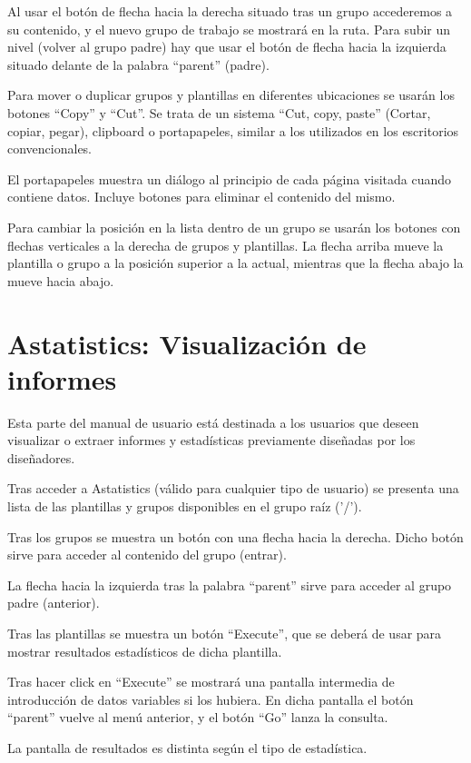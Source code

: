 \documentclass[spanish,12pt]{book}
\begin{document}
Al usar el botón de flecha hacia la derecha situado tras un grupo accederemos a su contenido, y el nuevo grupo de trabajo se mostrará en la ruta. Para subir un nivel (volver al grupo padre) hay que usar el botón de flecha hacia la izquierda situado delante de la palabra ``parent'' (padre).

Para mover o duplicar grupos y plantillas en diferentes ubicaciones se usarán los botones ``Copy'' y ``Cut''. Se trata de un sistema ``Cut, copy, paste'' (Cortar, copiar, pegar), clipboard o portapapeles, similar a los utilizados en los escritorios convencionales.

El portapapeles muestra un diálogo al principio de cada página visitada cuando contiene datos. Incluye botones para eliminar el contenido del mismo.

Para cambiar la posición en la lista dentro de un grupo se usarán los botones con flechas verticales a la derecha de grupos y plantillas. La flecha arriba mueve la plantilla o grupo a la posición superior a la actual, mientras que la flecha abajo la mueve hacia abajo.

\chapter{Astatistics: Visualización de informes}
Esta parte del manual de usuario está destinada a los usuarios que deseen visualizar o extraer informes y estadísticas previamente diseñadas por los diseñadores.

Tras acceder a Astatistics (válido para cualquier tipo de usuario) se presenta una lista de las plantillas y grupos disponibles en el grupo raíz ('/').

Tras los grupos se muestra un botón con una flecha hacia la derecha. Dicho botón sirve para acceder al contenido del grupo (entrar).

La flecha hacia la izquierda tras la palabra ``parent'' sirve para acceder al grupo padre (anterior).

Tras las plantillas se muestra un botón ``Execute'', que se deberá de usar para mostrar resultados estadísticos de dicha plantilla.

Tras hacer click en ``Execute'' se mostrará una pantalla intermedia de introducción de datos variables si los hubiera. En dicha pantalla el botón ``parent'' vuelve al menú anterior, y el botón ``Go'' lanza la consulta.

La pantalla de resultados es distinta según el tipo de estadística.
\end{document}
